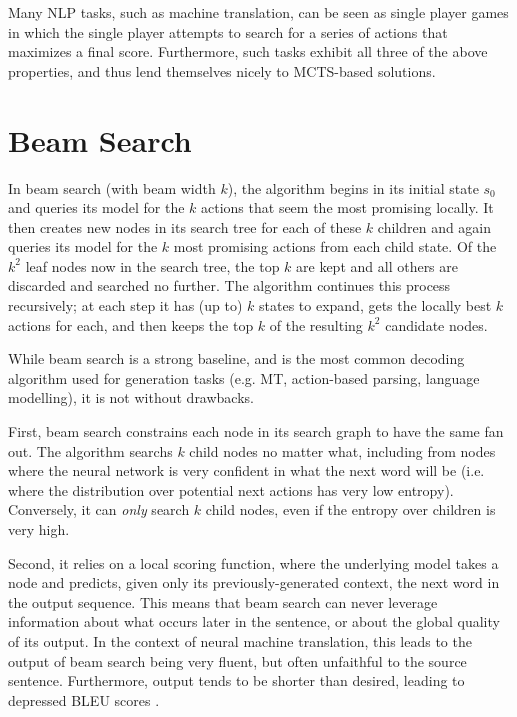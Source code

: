 \documentclass[11pt,a4paper]{article}
\begin{document}
Many NLP tasks, such as machine translation, can be seen as single player games in which
the single player attempts to search for a series of actions that maximizes a final score.
Furthermore, such tasks exhibit all three of the above properties, and thus lend themselves
nicely to MCTS-based solutions.

\section{Beam Search}
\label{sec:beam_search}
In beam search (with beam width $k$), the algorithm begins in its initial state
$s_0$ and queries its model for the $k$ actions that seem the most promising
locally. It then creates new nodes in its search tree for each of these $k$
children and again queries its model for the $k$ most promising actions from
each child state. Of the $k^2$ leaf nodes now in the search tree, the top $k$
are kept and all others are discarded and searched no further. The algorithm
continues this process recursively; at each step it has (up to) $k$ states to
expand, gets the locally best $k$ actions for each, and then keeps the top $k$
of the resulting $k^2$ candidate nodes.

While beam search is a strong baseline, and is the most common decoding
algorithm used for generation tasks (e.g. MT, action-based parsing, language
modelling), it is not without drawbacks.

First, beam search constrains each node in its search graph to have the same
fan out. The algorithm searchs $k$ child nodes no matter what, including from
nodes where the neural network is very confident in what the next word will be
(i.e. where the distribution over potential next actions has very low entropy).
Conversely, it can \emph{only} search $k$ child nodes, even if the entropy over
children is very high.

Second, it relies on a local scoring function, where the underlying model takes
a node and predicts, given only its previously-generated context, the next word
in the output sequence. This means that beam search can never leverage
information about what occurs later in the sentence, or about the global
quality of its output. In the context of neural machine translation, this leads
to the output of beam search being very fluent, but often unfaithful to the
source sentence. Furthermore, output tends to be shorter than desired, leading
to depressed BLEU scores \cite{koehn2017six}.
\end{document}
